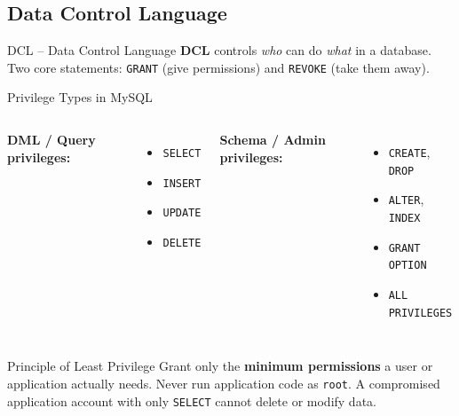 \subsection{Data Control Language}

\begin{frame}{DCL -- Data Control Language}
  \textbf{DCL} controls \emph{who} can do \emph{what} in a database.
  Two core statements: \texttt{GRANT} (give permissions) and \texttt{REVOKE} (take them away).

  \begin{block}{Privilege Types in MySQL}
    \begin{columns}[T]
        \textbf{DML / Query privileges:}
        \begin{itemize}
          \item \texttt{SELECT}
          \item \texttt{INSERT}
          \item \texttt{UPDATE}
          \item \texttt{DELETE}
        \end{itemize}
        \textbf{Schema / Admin privileges:}
        \begin{itemize}
          \item \texttt{CREATE}, \texttt{DROP}
          \item \texttt{ALTER}, \texttt{INDEX}
          \item \texttt{GRANT OPTION}
          \item \texttt{ALL PRIVILEGES}
        \end{itemize}
    \end{columns}
  \end{block}

  \begin{block}{Principle of Least Privilege}
    Grant only the \textbf{minimum permissions} a user or application actually needs.
    Never run application code as \texttt{root}. A compromised application account
    with only \texttt{SELECT} cannot delete or modify data.
  \end{block}
\end{frame}

